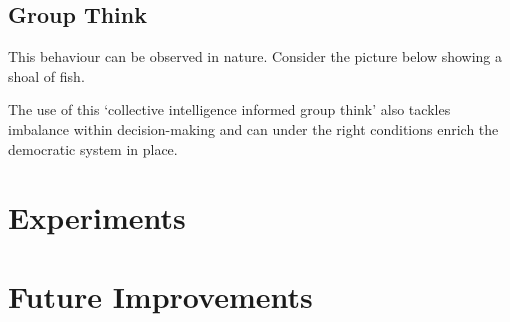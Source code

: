 \subsection{Group Think}
This behaviour can be observed in nature. Consider the picture below showing a shoal of fish. 

The use of this `collective intelligence informed group think' also tackles imbalance within decision-making and can under the right conditions enrich the democratic system in place.

\section{Experiments}

\section{Future Improvements}
